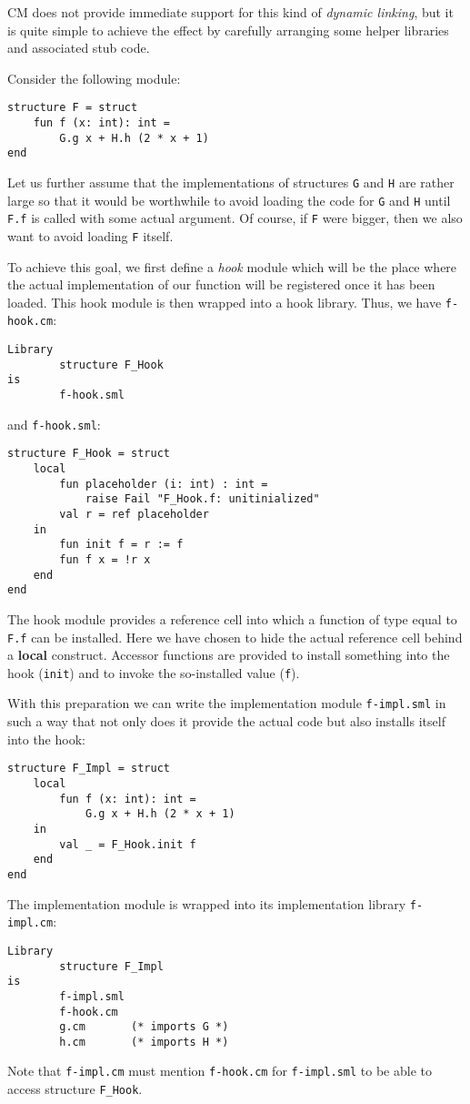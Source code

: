 \documentclass{article}
\begin{document}
CM does not provide immediate support for this kind of {\em dynamic
linking}, but it is quite simple to achieve the effect by carefully
arranging some helper libraries and associated stub code.

Consider the following module:
\begin{verbatim}
structure F = struct
    fun f (x: int): int =
        G.g x + H.h (2 * x + 1)
end
\end{verbatim}

Let us further assume that the implementations of structures {\tt G}
and {\tt H} are rather large so that it would be worthwhile to avoid
loading the code for {\tt G} and {\tt H} until {\tt F.f} is called
with some actual argument.  Of course, if {\tt F} were bigger, then we
also want to avoid loading {\tt F} itself.

To achieve this goal, we first define a {\em hook} module which will
be the place where the actual implementation of our function will be
registered once it has been loaded.  This hook module is then wrapped
into a hook library.  Thus, we have {\tt f-hook.cm}:
\begin{verbatim}
Library
        structure F_Hook
is
        f-hook.sml
\end{verbatim}

and {\tt f-hook.sml}:

\begin{verbatim}
structure F_Hook = struct
    local
        fun placeholder (i: int) : int =
            raise Fail "F_Hook.f: unitinialized"
        val r = ref placeholder
    in
        fun init f = r := f
        fun f x = !r x
    end
end
\end{verbatim}

The hook module provides a reference cell into which a function of
type equal to {\tt F.f} can be installed.  Here we have chosen to hide
the actual reference cell behind a {\bf local} construct.  Accessor
functions are provided to install something into the hook
({\tt init}) and to invoke the so-installed value ({\tt f}).

With this preparation we can write the implementation module {\tt f-impl.sml}
in such a way that not only does it provide the actual
code but also installs itself into the hook:
\begin{verbatim}
structure F_Impl = struct
    local
        fun f (x: int): int =
            G.g x + H.h (2 * x + 1)
    in
        val _ = F_Hook.init f
    end
end
\end{verbatim}
\noindent The implementation module is wrapped into its implementation
library {\tt f-impl.cm}:
\begin{verbatim}
Library
        structure F_Impl
is
        f-impl.sml
        f-hook.cm
        g.cm       (* imports G *)
        h.cm       (* imports H *)
\end{verbatim}
\noindent Note that {\tt f-impl.cm} must mention {\tt f-hook.cm} for
{\tt f-impl.sml} to be able to access structure {\tt F\_Hook}.
\end{document}
